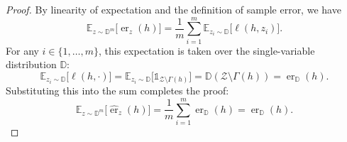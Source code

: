\begin{proof}

    By linearity of expectation and the definition of sample error, we have
    \[
        \mathbb{E}_{z\sim\mathbb{D}^m}\bigl[\hat{\operatorname{er}}_{z}(h)\bigr] = \frac{1}{m}\sum_{i=1}^m \mathbb{E}_{z_i\sim\mathbb{D}}\bigl[\ell(h,z_i)\bigr].
    \]
    For any $i \in \{1, \dots, m\}$, this expectation is taken over the single-variable distribution $\mathbb{D}$:
    \[
        \mathbb{E}_{z_i\sim\mathbb{D}}\bigl[\ell(h,\cdot)\bigr] = \mathbb{E}_{z_i\sim\mathbb{D}}\bigl[\mathds{1}_{\mathcal{Z}\setminus\Gamma(h)}\bigr] = \mathbb{D}(\mathcal{Z}\setminus\Gamma(h))=\operatorname{er}_{\mathbb{D}}(h).
    \]
    Substituting this into the sum completes the proof:
    \[
        \mathbb{E}_{z\sim\mathbb{D}^m}\bigl[\hat{\operatorname{er}}_{z}(h)\bigr] = \frac{1}{m}\sum_{i=1}^m \operatorname{er}_{\mathbb{D}}(h) = \operatorname{er}_{\mathbb{D}}(h).
    \]
    \qedhere
\end{proof}

%
%
%
%

